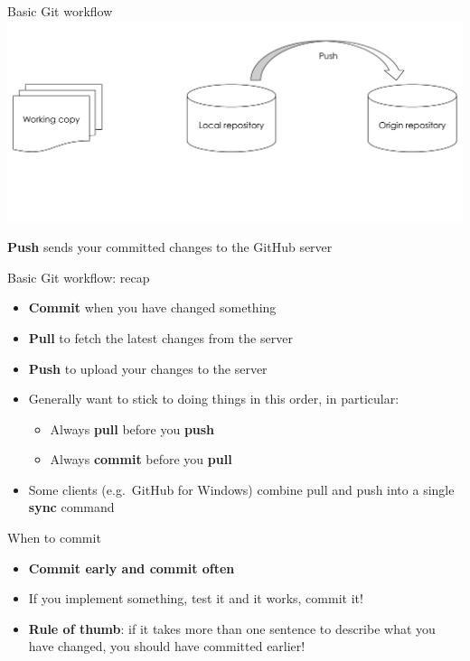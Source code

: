 \begin{frame}{Basic Git workflow}
    \includegraphics[width=\textwidth]{github_workflow_4}
    
    \textbf{Push} sends your committed changes to the GitHub server
\end{frame}

\begin{frame}{Basic Git workflow: recap}
    \begin{itemize}
        \item \textbf{Commit} when you have changed something \pause
        \item \textbf{Pull} to fetch the latest changes from the server \pause
        \item \textbf{Push} to upload your changes to the server \pause
        \item Generally want to stick to doing things in this order, in particular:
            \begin{itemize}
                \item Always \textbf{pull} before you \textbf{push}
                \item Always \textbf{commit} before you \textbf{pull} \pause
            \end{itemize}
        \item Some clients (e.g.\ GitHub for Windows)
            combine pull and push into a single \textbf{sync} command
    \end{itemize}
\end{frame}

\begin{frame}{When to commit}
    \begin{itemize}
        \item \textbf{Commit early and commit often} \pause
        \item If you implement something, test it and it works, commit it! \pause
        \item \textbf{Rule of thumb}: if it takes more than one sentence to describe what you have changed,
            you should have committed earlier!
    \end{itemize}
\end{frame}

